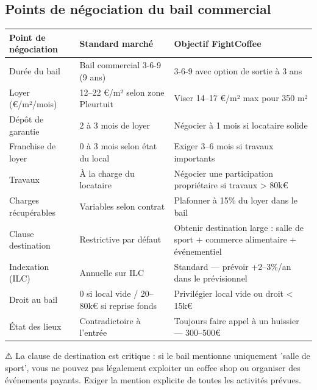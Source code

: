 \documentclass[11pt, a4paper]{article}
\begin{document}
\subsection{Points de négociation du bail commercial}

\begin{center}
\begin{tabular}{@{}p{3.5cm}p{4cm}p{5cm}@{}}
\toprule
\rowcolor{fc-ink}\color{white}\textbf{Point de négociation} & \color{white}\textbf{Standard marché} & \color{white}\textbf{Objectif FightCoffee} \\
\midrule
Durée du bail & Bail commercial 3-6-9 (9 ans) & 3-6-9 avec option de sortie à 3 ans \\
\rowcolor{fc-bg2} Loyer (€/m²/mois) & 12–22 €/m² selon zone Pleurtuit & Viser 14–17 €/m² max pour 350 m² \\
Dépôt de garantie & 2 à 3 mois de loyer & Négocier à 1 mois si locataire solide \\
\rowcolor{fc-bg2} Franchise de loyer & 0 à 3 mois selon état du local & Exiger 3–6 mois si travaux importants \\
Travaux & À la charge du locataire & Négocier une participation propriétaire si travaux > 80k€ \\
\rowcolor{fc-bg2} Charges récupérables & Variables selon contrat & Plafonner à 15\% du loyer dans le bail \\
Clause destination & Restrictive par défaut & Obtenir destination large : salle de sport + commerce alimentaire + événementiel \\
\rowcolor{fc-bg2} Indexation (ILC) & Annuelle sur ILC & Standard — prévoir +2–3\%/an dans le prévisionnel \\
Droit au bail & 0 si local vide / 20–80k€ si reprise fonds & Privilégier local vide ou droit < 15k€ \\
\rowcolor{fc-bg2} État des lieux & Contradictoire à l'entrée & Toujours faire appel à un huissier — 300–500€ \\
\bottomrule
\end{tabular}
\end{center}

\begin{warnbox}
⚠ La clause de destination est critique : si le bail mentionne uniquement 'salle de sport', vous ne pouvez pas légalement exploiter un coffee shop ou organiser des événements payants. Exiger la mention explicite de toutes les activités prévues.
\end{warnbox}
\end{document}
